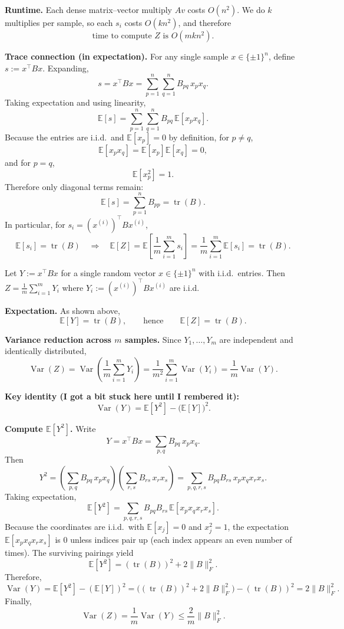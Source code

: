 \documentclass[10pt]{article}
\newcommand{\E}{\mathbb{E}}
\DeclareMathOperator{\Var}{Var}
\DeclareMathOperator{\tr}{tr}
\newcommand{\spara}[1]{\vspace{.5em}\noindent {\large\sffamily\textcolor{nyuOfficialPurple}{#1}}}
\begin{document}
\textbf{Runtime.}
Each dense matrix--vector multiply $Av$ costs $O(n^2)$. We do $k$ multiplies per sample, so each $s_i$ costs $O(kn^2)$, and therefore
\[
\boxed{\text{time to compute }Z\text{ is }O(mkn^2).}
\]

\medskip
\textbf{Trace connection (in expectation).}
For any single sample $x\in\{\pm 1\}^n$, define $s:=x^\top Bx$. Expanding,
\[
s = x^\top Bx = \sum_{p=1}^n\sum_{q=1}^n B_{pq}\,x_p x_q.
\]
Taking expectation and using linearity,
\[
\E[s] = \sum_{p=1}^n\sum_{q=1}^n B_{pq}\,\E[x_p x_q].
\]
Because the entries are i.i.d.\ and $\E[x_p]=0$ by definition, for $p\neq q$,
\[
\E[x_p x_q] = \E[x_p]\E[x_q] = 0,
\]
and for $p=q$,
\[
\E[x_p^2]=1.
\]
Therefore only diagonal terms remain:
\[
\E[s] = \sum_{p=1}^n B_{pp} = \tr(B).
\]
In particular, for $s_i=(x^{(i)})^\top Bx^{(i)}$,
\[
\E[s_i]=\tr(B)
\quad\Rightarrow\quad
\E[Z]=\E\left[\frac{1}{m}\sum_{i=1}^m s_i\right]
=\frac{1}{m}\sum_{i=1}^m \E[s_i]
=\tr(B).
\]

\medskip
\spara{Pr. 1(c)}
Let $Y:=x^\top Bx$ for a single random vector $x\in\{\pm 1\}^n$ with i.i.d.\ entries.
Then $Z=\frac{1}{m}\sum_{i=1}^m Y_i$ where $Y_i:=(x^{(i)})^\top Bx^{(i)}$ are i.i.d.

\textbf{Expectation.}
As shown above,
\[
\E[Y]=\tr(B),
\qquad\text{hence}\qquad
\E[Z]=\tr(B).
\]

\textbf{Variance reduction across $m$ samples.}
Since $Y_1,\dots,Y_m$ are independent and identically distributed,
\[
\Var(Z)
=
\Var\left(\frac{1}{m}\sum_{i=1}^m Y_i\right)
=
\frac{1}{m^2}\sum_{i=1}^m \Var(Y_i)
=
\frac{1}{m}\Var(Y).
\]

\textbf{Key identity (I got a bit stuck here until I rembered it):}
\[
\boxed{\Var(Y)=\E[Y^2]-\big(\E[Y]\big)^2.}
\]

\textbf{Compute $\E[Y^2]$.}
Write
\[
Y=x^\top Bx=\sum_{p,q} B_{pq}\,x_p x_q.
\]
Then
\[
Y^2
=
\left(\sum_{p,q} B_{pq}\,x_p x_q\right)
\left(\sum_{r,s} B_{rs}\,x_r x_s\right)
=
\sum_{p,q,r,s} B_{pq}B_{rs}\,x_p x_q x_r x_s.
\]
Taking expectation,
\[
\E[Y^2]=\sum_{p,q,r,s} B_{pq}B_{rs}\,\E[x_p x_q x_r x_s].
\]
Because the coordinates are i.i.d.\ with $\E[x_j]=0$ and $x_j^2=1$, the expectation
$\E[x_p x_q x_r x_s]$ is $0$ unless indices pair up (each index appears an even number of times).
The surviving pairings yield
\[
\E[Y^2]=(\tr(B))^2 + 2\|B\|_F^2.
\]
Therefore,
\[
\Var(Y)=\E[Y^2]-(\E[Y])^2
=\big((\tr(B))^2 + 2\|B\|_F^2\big)-(\tr(B))^2
=2\|B\|_F^2.
\]
Finally,
\[
\boxed{
\Var(Z)=\frac{1}{m}\Var(Y)\le \frac{2}{m}\|B\|_F^2.
}
\]

\medskip
\spara{Pr. 1(d)}
\end{document}
